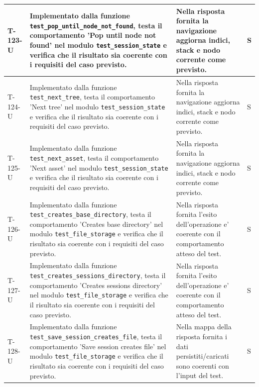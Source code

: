 \documentclass[a4paper,12pt]{article}
\begin{document}
{{\begin{longtable}{|>{\RaggedRight\arraybackslash}p{1.55cm}|>{\RaggedRight\arraybackslash}p{8.0cm}|>{\RaggedRight\arraybackslash}p{4.6cm}|>{\RaggedRight\arraybackslash}p{1.2cm}|}
        \hline
        T-123-U & Implementato dalla funzione \texttt{test\_\allowbreak pop\_\allowbreak until\_\allowbreak node\_\allowbreak not\_\allowbreak found}, testa il comportamento 'Pop until node not found' nel modulo \texttt{test\_\allowbreak session\_\allowbreak state} e verifica che il risultato sia coerente con i requisiti del caso previsto. & Nella risposta fornita la navigazione aggiorna indici, stack e nodo corrente come previsto. & S \\
        \hline
        T-124-U & Implementato dalla funzione \texttt{test\_\allowbreak next\_\allowbreak tree}, testa il comportamento 'Next tree' nel modulo \texttt{test\_\allowbreak session\_\allowbreak state} e verifica che il risultato sia coerente con i requisiti del caso previsto. & Nella risposta fornita la navigazione aggiorna indici, stack e nodo corrente come previsto. & S \\
        \hline
        T-125-U & Implementato dalla funzione \texttt{test\_\allowbreak next\_\allowbreak asset}, testa il comportamento 'Next asset' nel modulo \texttt{test\_\allowbreak session\_\allowbreak state} e verifica che il risultato sia coerente con i requisiti del caso previsto. & Nella risposta fornita la navigazione aggiorna indici, stack e nodo corrente come previsto. & S \\
        \hline
        T-126-U & Implementato dalla funzione \texttt{test\_\allowbreak creates\_\allowbreak base\_\allowbreak directory}, testa il comportamento 'Creates base directory' nel modulo \texttt{test\_\allowbreak file\_\allowbreak storage} e verifica che il risultato sia coerente con i requisiti del caso previsto. & Nella risposta fornita l'esito dell'operazione e' coerente con il comportamento atteso del test. & S \\
        \hline
        T-127-U & Implementato dalla funzione \texttt{test\_\allowbreak creates\_\allowbreak sessions\_\allowbreak directory}, testa il comportamento 'Creates sessions directory' nel modulo \texttt{test\_\allowbreak file\_\allowbreak storage} e verifica che il risultato sia coerente con i requisiti del caso previsto. & Nella risposta fornita l'esito dell'operazione e' coerente con il comportamento atteso del test. & S \\
        \hline
        T-128-U & Implementato dalla funzione \texttt{test\_\allowbreak save\_\allowbreak session\_\allowbreak creates\_\allowbreak file}, testa il comportamento 'Save session creates file' nel modulo \texttt{test\_\allowbreak file\_\allowbreak storage} e verifica che il risultato sia coerente con i requisiti del caso previsto. & Nella mappa della risposta fornita i dati persistiti/caricati sono coerenti con l'input del test. & S \\

\end{longtable}}}
\end{document}

